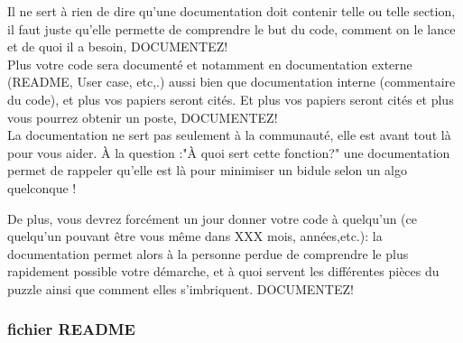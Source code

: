 Il ne sert à rien de dire qu'une documentation doit contenir telle ou telle section, il faut juste 
qu'elle permette de comprendre le but du code, comment on le lance et de quoi il a besoin, DOCUMENTEZ! \\

Plus votre code sera documenté et notamment en documentation externe (README, User case, etc,.) aussi 
bien que documentation interne (commentaire du code), et plus vos papiers seront cités. 
Et plus vos papiers seront cités et plus vous pourrez obtenir un poste, DOCUMENTEZ! \\

La documentation ne sert pas seulement à la communauté, elle est avant tout là pour vous aider. 
\`A la question :"\`A quoi sert cette fonction?" une documentation permet de rappeler qu'elle
 est là pour minimiser un bidule selon un algo quelconque ! 

De plus, vous devrez forcément un jour donner votre code \`a quelqu'un (ce quelqu'un
pouvant \^etre vous m\^eme dans XXX mois, années,etc.):
la documentation permet alors \`a la personne perdue de comprendre le plus rapidement possible 
votre démarche, et à quoi servent les différentes pièces du puzzle ainsi que comment elles 
s'imbriquent. DOCUMENTEZ!

\subsubsection*{fichier README }

